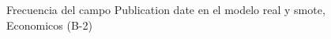 \begin{figure}[H]
    \centering
    
    \caption{Frecuencia del campo Publication date en el modelo real y smote, Economicos (B-2)}
    \label{frecuency-Publication Date-smote-enc}
\end{figure}